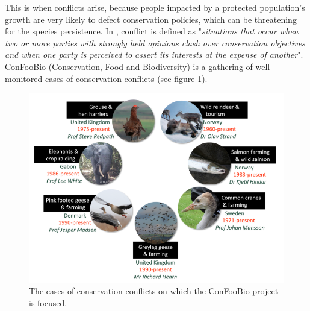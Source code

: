 \documentclass[12pt,a4paper]{article}
\begin{document}
This is when conflicts arise, because people impacted by a protected population's growth are very likely to defect conservation policies, which can be threatening for the species persistence.
In \cite{redpath2013understanding}, conflict is defined as "\textit{situations that occur when two or more parties with strongly held opinions clash over conservation objectives and when one party is perceived to assert its interests at the expense of another}".
ConFooBio (Conservation, Food and Biodiversity) is a gathering of well monitored cases of conservation conflicts (see figure \ref{confoobio}).\\
\begin{figure}
	\centering
	\includegraphics[scale=0.5]{confoobio-cases.png}
	\caption{The cases of conservation conflicts on which the ConFooBio project is focused.}
	\label{confoobio}
\end{figure}
\end{document}
